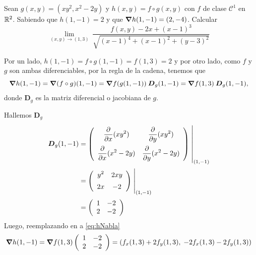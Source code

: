 \begin{solution}
    Sean $g(x,y)=(xy^2,x^2-2y)$ y $h(x,y)=f \circ g(x,y)$ con $f$ de clase $\mathcal{C}^1$ en $\mathbb{R}^2$. Sabiendo que $h(1,-1)=2$ y que $\grad h(1,-1)=(2,-4)$. Calcular
    \[
        \lim_{(x,y)\to (1,3)} \ 
        \frac{f(x,y)-2x+(x-1)^3}{\sqrt{(x-1)^4+(x-1)^2+(y-3)^2}}       
    \]

 Por un lado,      $h(1,-1)= f\circ g (1,-1) =  f(1,3)=2$  y por otro lado,  como $f$ y $g$ son ambas diferenciables,  por la regla de la cadena,  tenemos que
    \begin{equation}
        \grad h(1,-1)=\grad (f\circ g)(1,-1)=\grad f(g(1,-1)) \:\boldsymbol{D}_g(1,-1) = \grad f (1,3) \:\boldsymbol{D}_g(1,-1),  \label{eq:hNabla1}
    \end{equation}    donde $\boldsymbol{D}_g$ es la matriz diferencial o  jacobiana de $g$.

    
    \noindent  Hallemos $\boldsymbol{D}_g$
    \begin{align*}
        \boldsymbol{D}_g(1,-1) & =
        \left(\begin{array}{cc}
                      \displaystyle\partialx (xy^2)            & \displaystyle\partialy (xy^2)           \\[10pt]
                      \displaystyle\partialx  (x^2 -2y) & \displaystyle\partialy (x^2 -2y)
                  \end{array}\right)\left.\rule{0pt}{1.1cm}\right\rvert_{(1,-1)}             \\[2pt]
                              & =\left(\begin{array}{cc}
                                               \displaystyle y^2                 & \displaystyle 2xy              \\[5pt]
                                               \displaystyle   2x & \displaystyle -2
                                           \end{array}\right)\left.\rule{0pt}{0.7cm}\right\rvert_{(1,-1)} \\[2pt]
                              & =\left(\begin{array}{cc}
                                               1    & -2    \\
                                               2 & -2
                                           \end{array}\right)
    \end{align*}
    Luego, reemplazando en  a   \eqref{eq:hNabla}
    \[
        \grad h(1,-1) = \grad f(1,3)\left(\begin{array}{cc}
                1   & -2    \\
                2 & -2
            \end{array}\right) = \left(f_x(1,3) + 2f_y(1,3),\;-2f_x(1,3)-2f_y(1,3)\right)
    \]


\end{solution}
